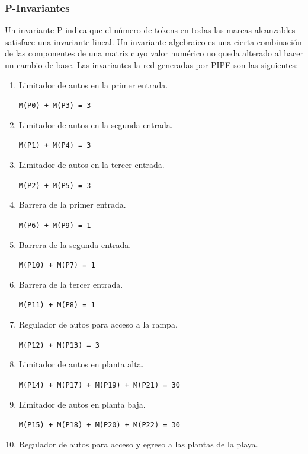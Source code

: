 \documentclass[12pt,a4paper]{article}
\begin{document}
\subsubsection{P-Invariantes}
Un invariante P indica que el número de tokens en todas las marcas alcanzables satisface una invariante lineal.
Un invariante algebraico es una cierta combinación de las componentes de una matriz cuyo valor numérico no queda alterado al hacer un cambio de base.
Las invariantes la red generadas por PIPE son las siguientes:

\begin{enumerate}[leftmargin=1.5cm]
\item Limitador de autos en la primer entrada.

        \verb|M(P0) + M(P3) = 3|
        
\item Limitador de autos en la segunda entrada.

        \verb|M(P1) + M(P4) = 3 |

\newpage
\item Limitador de autos en la tercer entrada.

        \verb|M(P2) + M(P5) = 3 |

\item Barrera de la primer entrada.

        \verb|M(P6) + M(P9) = 1|
        
\item Barrera de la segunda entrada.

        \verb|M(P10) + M(P7) = 1 |
        
\item Barrera de la tercer entrada.

        \verb|M(P11) + M(P8) = 1 |

\item Regulador de autos para acceso a la rampa.

        \verb|M(P12) + M(P13) = 3 |

\item Limitador de autos en planta alta.

        \verb|M(P14) + M(P17) + M(P19) + M(P21) = 30 |

\item Limitador de autos en planta baja.

        \verb|M(P15) + M(P18) + M(P20) + M(P22) = 30 |

\item Regulador de autos para acceso y egreso a las plantas de la playa.


\end{enumerate}
\end{document}
